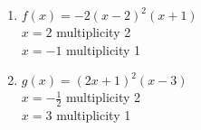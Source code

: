 \documentclass{ximera}
\begin{document}
\begin{multicols}{2}
\begin{enumerate}
\setcounter{enumi}{\value{HW}}

\item $f(x) = -2(x-2)^2(x+1)$\\
$x=2$ multiplicity 2 \\
$x=-1$ multiplicity 1\\




\item $g(x) = (2x+1)^2(x-3)$\\
$x=-\frac{1}{2}$ multiplicity 2 \\
$x=3$ multiplicity 1\\




\setcounter{HW}{\value{enumi}}
\end{enumerate}
\end{multicols}

\pagebreak
\end{document}
